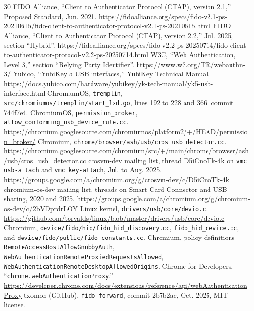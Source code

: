 \documentclass[journal,9pt]{IEEEtran}
\theoremstyle{definition}
\theoremstyle{remark}
\newcommand{\code}[1]{\texttt{#1}}
\begin{document}
\begin{thebibliography}{30}
 FIDO Alliance, ``Client to Authenticator Protocol (CTAP), version 2.1,''
  Proposed Standard, Jun. 2021. \url{https://fidoalliance.org/specs/fido-v2.1-ps-20210615/fido-client-to-authenticator-protocol-v2.1-ps-20210615.html}
 FIDO Alliance, ``Client to Authenticator Protocol (CTAP), version 2.2,''
  Jul. 2025, section ``Hybrid''. \url{https://fidoalliance.org/specs/fido-v2.2-ps-20250714/fido-client-to-authenticator-protocol-v2.2-ps-20250714.html}
 W3C, ``Web Authentication, Level 3,'' section ``Relying Party Identifier''.
  \url{https://www.w3.org/TR/webauthn-3/}
 Yubico, ``YubiKey 5 USB interfaces,'' YubiKey Technical Manual.
  \url{https://docs.yubico.com/hardware/yubikey/yk-tech-manual/yk5-usb-interface.html}
 ChromiumOS, \code{tremplin}, \code{src/chromiumos/tremplin/start\_lxd.go},
  lines 192 to 228 and 366, commit 744f7e4.
 ChromiumOS, \code{permission\_broker},
  \code{allow\_conforming\_usb\_device\_rule.cc}.
  \url{https://chromium.googlesource.com/chromiumos/platform2/+/HEAD/permission_broker/}
 Chromium, \code{chrome/browser/ash/usb/cros\_usb\_detector.cc}.
  \url{https://chromium.googlesource.com/chromium/src/+/main/chrome/browser/ash/usb/cros_usb_detector.cc}
 crosvm-dev mailing list, thread D5iCnoTk-4k on \code{vmc usb-attach} and \code{vmc key-attach}, Jul. to Aug. 2025.
  \url{https://groups.google.com/a/chromium.org/g/crosvm-dev/c/D5iCnoTk-4k}
 chromium-os-dev mailing list, threads on Smart Card Connector and
  USB sharing, 2020 and 2025.
  \url{https://groups.google.com/a/chromium.org/g/chromium-os-dev/c/2bVDprdrLOY}
 Linux kernel, \code{drivers/usb/core/devio.c}.
  \url{https://github.com/torvalds/linux/blob/master/drivers/usb/core/devio.c}
 Chromium, \code{device/fido/hid/fido\_hid\_discovery.cc},
  \code{fido\_hid\_device.cc}, and \code{device/fido/public/fido\_constants.cc}.
 Chromium, policy definitions \code{RemoteAccessHostAllowGnubbyAuth},
  \code{WebAuthenticationRemoteProxiedRequestsAllowed},
  \code{WebAuthenticationRemoteDesktopAllowedOrigins}.
 Chrome for Developers, ``\code{chrome.webAuthenticationProxy}.''
  \url{https://developer.chrome.com/docs/extensions/reference/api/webAuthenticationProxy}
 txomon (GitHub), \code{fido-forward}, commit 2b7b2ac, Oct. 2026, MIT license.

\end{thebibliography}
\end{document}
